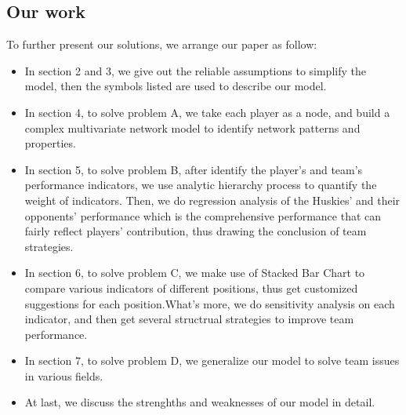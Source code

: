 \documentclass{mcmthesis}
\begin{document}
\subsection{Our work}
To further present our solutions, we arrange our paper as follow:
\begin{itemize}
\item In section 2 and 3, we give out the reliable assumptions to simplify the model, then the symbols listed are used to describe our model.
\item In section 4, to solve problem A, we take each player as a node, and build a complex multivariate network model to identify network patterns and properties.
\item In section 5, to solve problem B, after identify the player's and team's performance indicators, we use analytic hierarchy process to quantify the weight of indicators. Then, we do regression analysis of the Huskies' and their opponents' performance which is the comprehensive performance that can fairly reflect players' contribution, thus drawing the conclusion of team strategies.
\item In section 6, to solve problem C, we make use of Stacked Bar Chart to compare various indicators of different positions, thus get customized suggestions for each position.What's more, we do sensitivity analysis on each indicator, and then get several structrual strategies to improve team performance.
\item In section 7, to solve problem D, we generalize our model to solve team issues in various fields.
\item At last, we discuss the strenghths and weaknesses of our model in detail.

\end{itemize}
\end{document}
